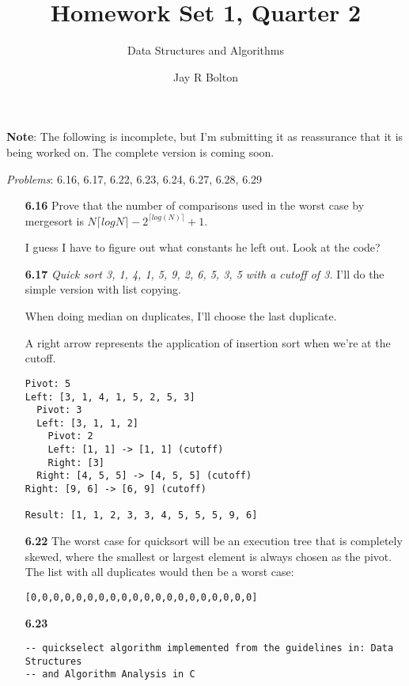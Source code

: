 \documentclass{article}
\title{Homework Set 1, Quarter 2}
\author{Data Structures and Algorithms}
\author{Jay R Bolton}
\begin{document}
\maketitle

\textbf{Note}: The following is incomplete, but I'm submitting it as
reassurance that it is being worked on. The complete version is coming soon.

\textit{Problems}: 6.16, 6.17, 6.22, 6.23, 6.24, 6.27, 6.28, 6.29

\begin{enumerate}

\item[\textbf{6.16}]
	Prove that the number of comparisons used in the worst case by mergesort is
	$N\lceil log N\rceil - 2^{\lceil log(N)\rceil} + 1$.

	I guess I have to figure out what constants he left out. Look at the code?


\item[\textbf{6.17}]
\textit{Quick sort 3, 1, 4, 1, 5, 9, 2, 6, 5, 3, 5 with a cutoff of 3.} I'll do
the simple version with list copying.

When doing median on duplicates, I'll choose the last duplicate.

A right arrow represents the application of insertion sort when we're at the cutoff.

\begin{verbatim}
Pivot: 5
Left: [3, 1, 4, 1, 5, 2, 5, 3]
  Pivot: 3 
  Left: [3, 1, 1, 2] 
    Pivot: 2 
    Left: [1, 1] -> [1, 1] (cutoff) 
    Right: [3] 
  Right: [4, 5, 5] -> [4, 5, 5] (cutoff) 
Right: [9, 6] -> [6, 9] (cutoff) 

Result: [1, 1, 2, 3, 3, 4, 5, 5, 5, 9, 6]
\end{verbatim}

\item[\textbf{6.22}]
The worst case for quicksort will be an execution tree that is completely skewed, where the smallest or largest element is always chosen as the pivot. The list with all duplicates would then be a worst case:

\begin{verbatim}
[0,0,0,0,0,0,0,0,0,0,0,0,0,0,0,0,0,0,0,0]
\end{verbatim}

\item[\textbf{6.23}]

\begin{verbatim}
-- quickselect algorithm implemented from the guidelines in: Data Structures
-- and Algorithm Analysis in C


\end{verbatim}
\end{enumerate}
\end{document}
